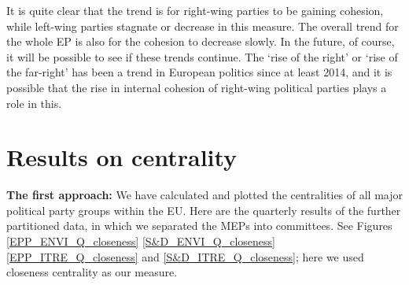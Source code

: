 \documentclass[lettersize,journal]{IEEEtran}
\begin{document}
It is quite clear that the trend is for right-wing parties to be gaining cohesion, while left-wing parties stagnate or decrease in this measure. The overall trend for the whole EP is also for the cohesion to decrease slowly. In the future, of course, it will be possible to see if these trends continue. The `rise of the right' or `rise of the far-right' has been a trend in European politics since at least 2014, and it is possible that the rise in internal cohesion of right-wing political parties plays a role in this.


\section{Results on centrality} \label{sec:results}


\textbf{The first approach:} We have calculated and plotted the centralities of all major political party groups within the EU. Here are the quarterly results of the further partitioned data, in which we separated the MEPs into committees. See Figures \ref{EPP_ENVI_Q_closeness} \ref{S&D_ENVI_Q_closeness} \ref{EPP_ITRE_Q_closeness} and \ref{S&D_ITRE_Q_closeness}; here we used closeness centrality as our measure. 
\end{document}
